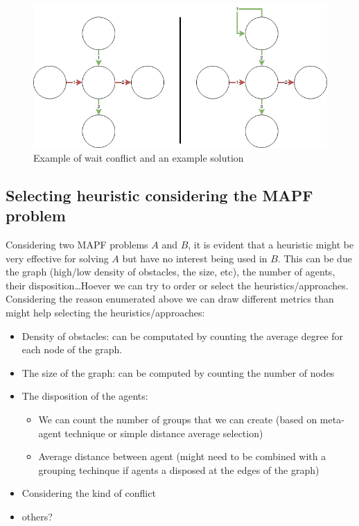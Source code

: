 \begin{figure}[H]
  \centering
  \caption{Example of wait conflict and an example solution}\label{img:waitconflict}
  \includegraphics[width=\widthimg]{img/WaitConflict.drawio.png}
\end{figure}






\subsection{Selecting heuristic considering the MAPF problem}\label{subsec:selecting_heuristic}
Considering two MAPF problems \(A\) and \(B\), it is evident that a heuristic might be very effective for solving \(A\) but have no interest being used in \(B\). This can be due the graph (high/low density of obstacles, the size, etc), the number of agents, their disposition\ldots Hoever we can try to order or select the heuristics/approaches. Considering the reason enumerated above we can draw different metrics than might help selecting the heuristics/approaches:
\begin{itemize}
  \item Density of obstacles: can be computated by counting the average degree for each node of the graph.
  \item The size of the graph: can be computed by counting the number of nodes
  \item The disposition of the agents:\begin{itemize}
    \item We can count the number of groups that we can create (based on meta-agent technique or simple distance average selection)
    \item Average distance between agent (might need to be combined with a grouping techinque if agents a disposed at the edges of the graph)
  \end{itemize}
  \item Considering the kind of conflict
  \item others?
 \end{itemize} 


